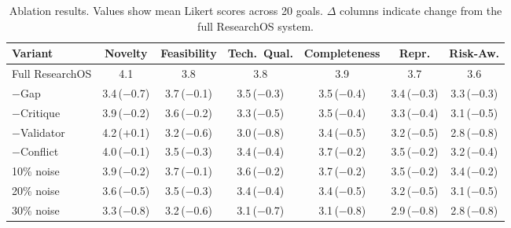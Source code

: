 \begin{table}[t]
\centering
\caption{Ablation results. Values show mean Likert scores across 20 goals. $\Delta$ columns indicate change from the full ResearchOS system.}
\label{tab:ablations}
\small
\begin{tabular}{@{}l cccccc@{}}
\toprule
\textbf{Variant} & \textbf{Novelty} & \textbf{Feasibility} & \textbf{Tech.\ Qual.} & \textbf{Completeness} & \textbf{Repr.} & \textbf{Risk-Aw.} \\
\midrule
Full ResearchOS & 4.1 & 3.8 & 3.8 & 3.9 & 3.7 & 3.6 \\
\midrule
$-$Gap & 3.4\,\scriptsize{($-$0.7)} & 3.7\,\scriptsize{($-$0.1)} & 3.5\,\scriptsize{($-$0.3)} & 3.5\,\scriptsize{($-$0.4)} & 3.4\,\scriptsize{($-$0.3)} & 3.3\,\scriptsize{($-$0.3)} \\
$-$Critique & 3.9\,\scriptsize{($-$0.2)} & 3.6\,\scriptsize{($-$0.2)} & 3.3\,\scriptsize{($-$0.5)} & 3.5\,\scriptsize{($-$0.4)} & 3.3\,\scriptsize{($-$0.4)} & 3.1\,\scriptsize{($-$0.5)} \\
$-$Validator & 4.2\,\scriptsize{($+$0.1)} & 3.2\,\scriptsize{($-$0.6)} & 3.0\,\scriptsize{($-$0.8)} & 3.4\,\scriptsize{($-$0.5)} & 3.2\,\scriptsize{($-$0.5)} & 2.8\,\scriptsize{($-$0.8)} \\
$-$Conflict & 4.0\,\scriptsize{($-$0.1)} & 3.5\,\scriptsize{($-$0.3)} & 3.4\,\scriptsize{($-$0.4)} & 3.7\,\scriptsize{($-$0.2)} & 3.5\,\scriptsize{($-$0.2)} & 3.2\,\scriptsize{($-$0.4)} \\
\midrule
10\% noise & 3.9\,\scriptsize{($-$0.2)} & 3.7\,\scriptsize{($-$0.1)} & 3.6\,\scriptsize{($-$0.2)} & 3.7\,\scriptsize{($-$0.2)} & 3.5\,\scriptsize{($-$0.2)} & 3.4\,\scriptsize{($-$0.2)} \\
20\% noise & 3.6\,\scriptsize{($-$0.5)} & 3.5\,\scriptsize{($-$0.3)} & 3.4\,\scriptsize{($-$0.4)} & 3.4\,\scriptsize{($-$0.5)} & 3.2\,\scriptsize{($-$0.5)} & 3.1\,\scriptsize{($-$0.5)} \\
30\% noise & 3.3\,\scriptsize{($-$0.8)} & 3.2\,\scriptsize{($-$0.6)} & 3.1\,\scriptsize{($-$0.7)} & 3.1\,\scriptsize{($-$0.8)} & 2.9\,\scriptsize{($-$0.8)} & 2.8\,\scriptsize{($-$0.8)} \\
\bottomrule
\end{tabular}
\end{table}
